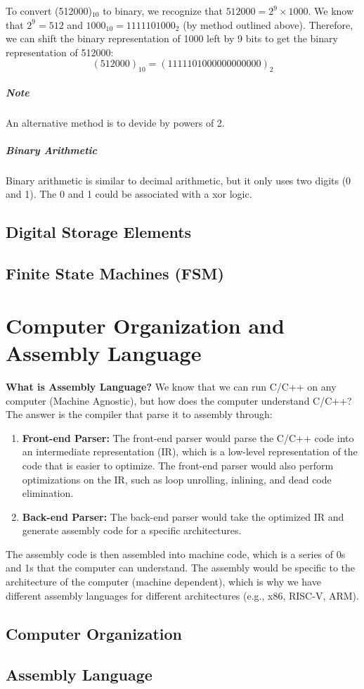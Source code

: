 \documentclass[11pt]{report}
\begin{document}
\begin{example}
    To convert (512000)$_{10}$ to binary, we recognize that $512000 = 2^9 \times 1000$. We know that $2^9 = 512$ and $1000_{10} = 1111101000_2$ (by method outlined above). Therefore, we can shift the binary representation of 1000 left by 9 bits to get the binary representation of 512000:
    \[(512000)_{10} = (1111101000000000000)_2\]
\end{example}

\paragraph{Note} An alternative method is to devide by powers of 2.

\paragraph{Binary Arithmetic} Binary arithmetic is similar to decimal arithmetic, but it only uses two digits (0 and 1). The 0 and 1 could be associated with a xor logic.
\section{Digital Storage Elements}

\section{Finite State Machines (FSM)}

\chapter{Computer Organization and Assembly Language}
\begin{shaded}
\textbf{What is Assembly Language?} We know that we can run C/C++ on any computer (Machine Agnostic), but how does the computer understand C/C++? The answer is the compiler that parse it to assembly through:

\begin{enumerate}
    \item \textbf{Front-end Parser:} The front-end parser would parse the C/C++ code into an intermediate representation (IR), which is a low-level representation of the code that is easier to optimize. The front-end parser would also perform optimizations on the IR, such as loop unrolling, inlining, and dead code elimination.
    \item \textbf{Back-end Parser:} The back-end parser would take the optimized IR and generate assembly code for a specific architectures.
\end{enumerate}

The assembly code is then assembled into machine code, which is a series of 0s and 1s that the computer can understand. The assembly would be specific to the architecture of the computer (machine dependent), which is why we have different assembly languages for different architectures (e.g., x86, RISC-V, ARM).
\end{shaded}
\section{Computer Organization}

\section{Assembly Language}
\end{document}

